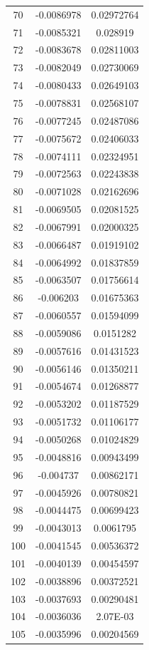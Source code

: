 \documentclass[a4paper, 11pt, oneside]{report}
\begin{document}
{\begin{longtable}{|c|c|c|}
70  & -0.0086978 & 0.02972764 \\
71  & -0.0085321 & 0.028919   \\
72  & -0.0083678 & 0.02811003 \\
73  & -0.0082049 & 0.02730069 \\
74  & -0.0080433 & 0.02649103 \\
75  & -0.0078831 & 0.02568107 \\
76  & -0.0077245 & 0.02487086 \\
77  & -0.0075672 & 0.02406033 \\
78  & -0.0074111 & 0.02324951 \\
79  & -0.0072563 & 0.02243838 \\
80  & -0.0071028 & 0.02162696 \\
81  & -0.0069505 & 0.02081525 \\
82  & -0.0067991 & 0.02000325 \\
83  & -0.0066487 & 0.01919102 \\
84  & -0.0064992 & 0.01837859 \\
85  & -0.0063507 & 0.01756614 \\
86  & -0.006203  & 0.01675363 \\
87  & -0.0060557 & 0.01594099 \\
88  & -0.0059086 & 0.0151282  \\
89  & -0.0057616 & 0.01431523 \\
90  & -0.0056146 & 0.01350211 \\
91  & -0.0054674 & 0.01268877 \\
92  & -0.0053202 & 0.01187529 \\
93  & -0.0051732 & 0.01106177 \\
94  & -0.0050268 & 0.01024829 \\
95  & -0.0048816 & 0.00943499 \\
96  & -0.004737  & 0.00862171 \\
97  & -0.0045926 & 0.00780821 \\
98  & -0.0044475 & 0.00699423 \\
99  & -0.0043013 & 0.0061795  \\
100 & -0.0041545 & 0.00536372 \\
101 & -0.0040139 & 0.00454597 \\
102 & -0.0038896 & 0.00372521 \\
103 & -0.0037693 & 0.00290481 \\
104 & -0.0036036 & 2.07E-03   \\
105 & -0.0035996 & 0.00204569 \\

\end{longtable}}
\end{document}
